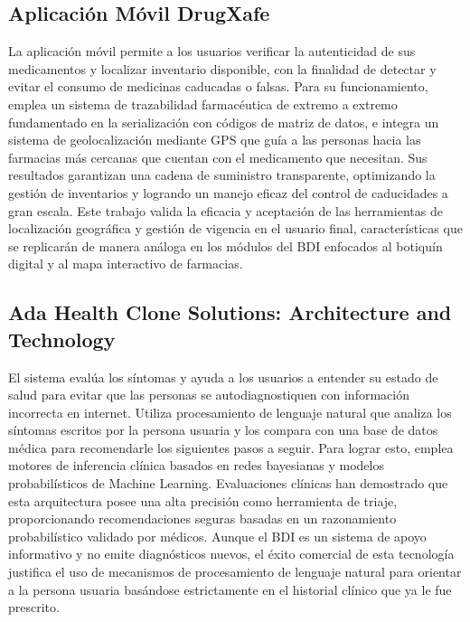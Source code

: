 \subsection [Aplicación Móvil DrugXafe ]{Aplicación Móvil DrugXafe}
La aplicación móvil \cite{DrugXafe} permite a los usuarios verificar la autenticidad de sus medicamentos y localizar inventario disponible, con la finalidad de detectar y evitar el consumo de medicinas caducadas o falsas. Para su funcionamiento, emplea un sistema de trazabilidad farmacéutica de extremo a extremo fundamentado en la serialización con códigos de matriz de datos, e integra un sistema de geolocalización mediante GPS que guía a las personas hacia las farmacias más cercanas que cuentan con el medicamento que necesitan. Sus resultados garantizan una cadena de suministro transparente, optimizando la gestión de inventarios y logrando un manejo eficaz del control de caducidades a gran escala. Este trabajo valida la eficacia y aceptación de las herramientas de localización geográfica y gestión de vigencia en el usuario final, características que se replicarán de manera análoga en los módulos del BDI enfocados al botiquín digital y al mapa interactivo de farmacias.

\subsection [Ada Health Clone Solutions: Architecture and Technology]{Ada Health Clone Solutions: Architecture and Technology}
El sistema \cite{AdaHealthApp} evalúa los síntomas y ayuda a los usuarios a entender su estado de salud para evitar que las personas se autodiagnostiquen con información incorrecta en internet. Utiliza procesamiento de lenguaje natural que analiza los síntomas escritos por la persona usuaria y los compara con una base de datos médica para recomendarle los siguientes pasos a seguir. Para lograr esto, emplea motores de inferencia clínica basados en redes bayesianas y modelos probabilísticos de Machine Learning. Evaluaciones clínicas han demostrado que esta arquitectura posee una alta precisión como herramienta de triaje, proporcionando recomendaciones seguras basadas en un razonamiento probabilístico validado por médicos. Aunque el BDI es un sistema de apoyo informativo y no emite diagnósticos nuevos, el éxito comercial de esta tecnología justifica el uso de mecanismos de procesamiento de lenguaje natural para orientar a la persona usuaria basándose estrictamente en el historial clínico que ya le fue prescrito.

